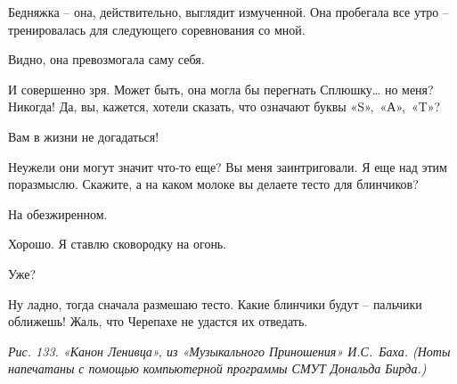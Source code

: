 \documentclass[../main.tex]{subfiles}
\begin{document}
\begin{dialogue}
 Бедняжка \--- она, действительно, выглядит измученной. Она пробегала все утро \--- тренировалась для следующего соревнования со мной.

 Видно, она превозмогала саму себя.

 И совершенно зря. Может быть, она могла бы перегнать Сплюшку\ldots{} но меня? Никогда! Да, вы, кажется, хотели сказать, что означают буквы «S»,~«А»,~«T»?

 Вам в жизни не догадаться!

 Неужели они могут значит что-то еще? Вы меня заинтриговали. Я еще над этим поразмыслю. Скажите, а на каком молоке вы делаете тесто для блинчиков?

 На обезжиренном.

 Хорошо. Я ставлю сковородку на огонь.

 Уже?

 Ну ладно, тогда сначала размешаю тесто. Какие блинчики будут \--- пальчики оближешь! Жаль, что Черепахе не удастся их отведать.

\emph{Рис. 133. «Канон Ленивца», из «Музыкального Приношения» И.С.~Баха. (Ноты напечатаны с помощью компьютерной программы СМУТ Дональда Бирда.)}

\end{dialogue}
\end{document}
